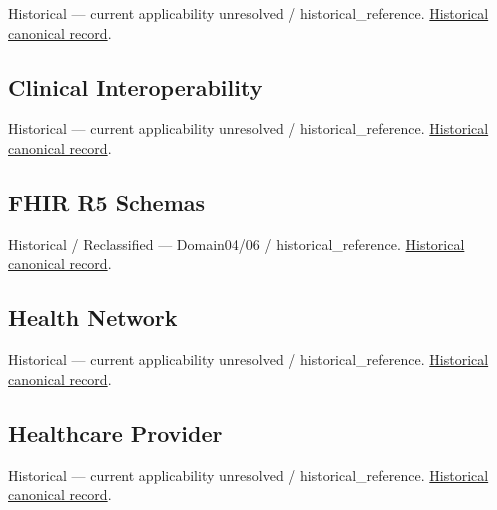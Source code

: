 \par\label{element:6f5a203d81e24a81b384a80781987daa}
Historical — current applicability unresolved / historical\_reference. \href{../../../../continuum/motivation/stakeholder/6f5a203d81e24a81b384a80781987daa.md}{Historical canonical record}.\par

\subsection{Clinical Interoperability}

\par\label{element:babb9f5d63d8435890c1db3579ec78d9}
Historical — current applicability unresolved / historical\_reference. \href{../../../../continuum/motivation/driver/babb9f5d63d8435890c1db3579ec78d9.md}{Historical canonical record}.\par

\subsection{FHIR R5 Schemas}

\par\label{element:8d8c62b8cb7b40b0be2ce23f7f41f154}
Historical / Reclassified — Domain04/06 / historical\_reference. \href{../../../../continuum/motivation/requirement/8d8c62b8cb7b40b0be2ce23f7f41f154.md}{Historical canonical record}.\par

\subsection{Health Network}

\par\label{element:55e57c01dfe146a2a225228b31196862}
Historical — current applicability unresolved / historical\_reference. \href{../../../../continuum/motivation/stakeholder/55e57c01dfe146a2a225228b31196862.md}{Historical canonical record}.\par

\subsection{Healthcare Provider}

\par\label{element:2018200a493d458096b72031cc2ae779}
Historical — current applicability unresolved / historical\_reference. \href{../../../../continuum/motivation/stakeholder/2018200a493d458096b72031cc2ae779.md}{Historical canonical record}.\par

